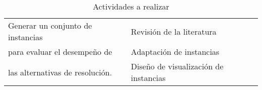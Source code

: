 \begin{table}[H]
\begin{center}
\begin{tabular}{ll}
Generar un conjunto de instancias                                                                     & Revisión de la literatura                       \\
para evaluar el desempeño de                                                                          & Adaptación de instancias                        \\
las alternativas de resolución.                                                                       & Diseño de visualización de instancias           \\
\hline
\end{tabular}
\end{center}
\caption{Actividades a realizar}
\label{tabla_obj}
\end{table}